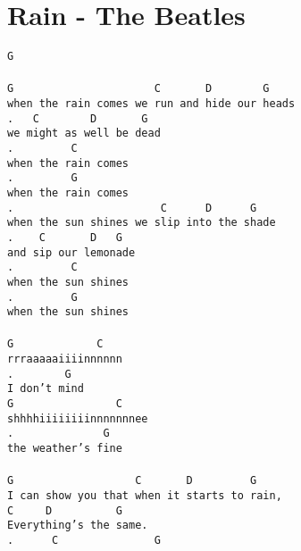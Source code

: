 \newpage
\section{Rain - The Beatles}
\label{Rain - The Beatles}
\texttt{G\\
\\
G\ \ \ \ \ \ \ \ \ \ \ \ \ \ \ \ \ \ \ \ \ \ C\ \ \ \ \ \ \ D\ \ \ \ \ \ \ \ G\\
when\ the\ rain\ comes\ we\ run\ and\ hide\ our\ heads\\
.\ \ \ C\ \ \ \ \ \ \ \ D\ \ \ \ \ \ \ G\\
we\ might\ as\ well\ be\ dead\\
.\ \ \ \ \ \ \ \ \ C\\
when\ the\ rain\ comes\\
.\ \ \ \ \ \ \ \ \ G\\
when\ the\ rain\ comes\\
.\ \ \ \ \ \ \ \ \ \ \ \ \ \ \ \ \ \ \ \ \ \ \ C\ \ \ \ \ \ D\ \ \ \ \ \ G\ \\
when\ the\ sun\ shines\ we\ slip\ into\ the\ shade\\
.\ \ \ \ C\ \ \ \ \ \ \ D\ \ \ G\\
and\ sip\ our\ lemonade\\
.\ \ \ \ \ \ \ \ \ C\\
when\ the\ sun\ shines\\
.\ \ \ \ \ \ \ \ \ G\\
when\ the\ sun\ shines\\
\\
G\ \ \ \ \ \ \ \ \ \ \ \ \ C\ \ \ \ \\
rrraaaaaiiiinnnnnn\\
.\ \ \ \ \ \ \ \ G\\
I\ don't\ mind\\
G\ \ \ \ \ \ \ \ \ \ \ \ \ \ \ \ C\ \ \\
shhhhiiiiiiiinnnnnnnee\\
.\ \ \ \ \ \ \ \ \ \ \ \ \ \ G\\
the\ weather's\ fine\\
\\
G\ \ \ \ \ \ \ \ \ \ \ \ \ \ \ \ \ \ \ C\ \ \ \ \ \ \ D\ \ \ \ \ \ \ \ \ G\\
I\ can\ show\ you\ that\ when\ it\ starts\ to\ rain,\\
C\ \ \ \ \ D\ \ \ \ \ \ \ \ \ \ G\\
Everything's\ the\ same.\\
.\ \ \ \ \ \ C\ \ \ \ \ \ \ \ \ \ \ \ \ \ \ G\\
}
